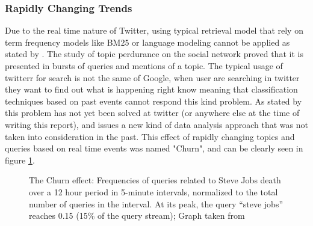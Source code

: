 \subsubsection{Rapidly Changing Trends} %
\label{ssub:real_time_}
Due to the real time nature of Twitter, using typical retrieval model that rely on term frequency models like BM25 or language modeling cannot be applied as stated by \citet{Lin2012}. The study of topic perdurance on the social network proved that it is presented in bursts of queries and mentions of a topic. The typical usage of twitterr for search is not the same of Google, when user are searching in twitter they want to find out what is happening right know meaning that classification techniques based on past events cannot respond this kind problem. As stated by \citet{Lin2012} this problem has not yet been solved at twitter (or anywhere else at the time of writing this report), and issues a new kind of data analysis approach that was not taken into consideration in the past. 
This effect of rapidly changing topics and queries based on real time events was named "Churn", and can be clearly seen in figure \ref{fig:churn}.

  \begin{figure}[tb]
    \begin{center}
    \noindent{}
    \end{center}
    \caption{The Churn effect: Frequencies of queries related to Steve Jobs death over a 12 hour period in 5-minute intervals, normalized to the total number of queries in the interval. At its peak, the query “steve jobs” reaches 0.15 (15\% of the query stream); Graph taken from \cite{Lin2012}}
    \label{fig:churn}
  \end{figure}

